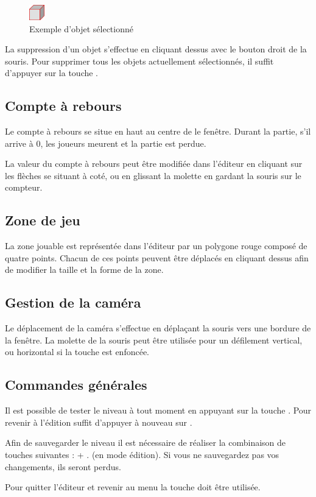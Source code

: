 \begin{figure}[h]
    \centering
    \includegraphics[width=25px]{figures/manuel-selected-block.png}
    \caption{Exemple d'objet sélectionné}
    \label{fig:manuel-selection}
\end{figure}

La suppression d'un objet s'effectue en cliquant dessus avec le bouton
droit de la souris. Pour supprimer tous les objets actuellement sélectionnés,
il suffit d'appuyer sur la touche .

\subsection{Compte à rebours}

Le compte à rebours se situe en haut au centre de le fenêtre. Durant la partie,
s'il arrive à 0, les joueurs meurent et la partie est perdue.

La valeur du compte à rebours peut être modifiée dans l'éditeur en cliquant
sur les flèches se situant à coté, ou en glissant la molette en gardant la
souris sur le compteur.

\subsection{Zone de jeu}

La zone jouable est représentée dans l'éditeur par un polygone
rouge composé de quatre points. Chacun de ces points peuvent être
déplacés en cliquant dessus afin de modifier la taille et la
forme de la zone.

\subsection{Gestion de la caméra}

Le déplacement de la caméra s'effectue en déplaçant la souris vers
une bordure de la fenêtre. La molette de la souris peut être utilisée
pour un défilement vertical, ou horizontal si la touche 
est enfoncée.

\subsection{Commandes générales}

Il est possible de tester le niveau à tout moment en appuyant sur la
touche . Pour revenir à l'édition suffit d'appuyer à
nouveau sur .

Afin de sauvegarder le niveau il est nécessaire de réaliser la
combinaison de touches suivantes :  + . (en mode édition).
Si vous ne sauvegardez pas vos changements, ils seront perdus.

Pour quitter l’éditeur et revenir au menu la touche  doit être utilisée.
